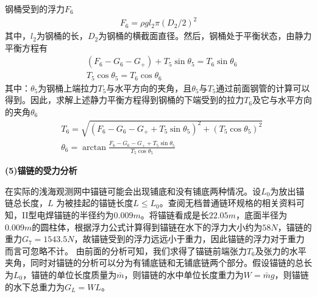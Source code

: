             \par
            钢桶受到的浮力$F_6$
            \begin{align*}
            F_6 = \rho g l_2 \pi ( {D_2}/{2} ) ^2
            \end{align*}
            其中，$l_2$为钢桶的长，$D_2$为钢桶的横截面直径。然后，钢桶处于平衡状态，由静力平衡方程有
            \begin{align*}
            & (F_6 - G_6 - G_+) +T_5\sin \theta_5 = T_6\sin  \theta_6\\
            & T_5\cos\theta_5 = T_6\cos \theta_6
            \end{align*}
            其中：$\theta_5$为钢桶上端拉力$T_5$与水平方向的夹角，且$\theta_5$与$T_5$通过前面钢管的计算可以得到。因此，求解上述静力平衡方程得到钢桶的下端受到的拉力$T_6$及它与水平方向的夹角$\theta_6$
            \begin{align*}
            & T_6 = \sqrt{(F_6 - G_6 -G_+ +T_5\sin \theta_5)^2+(T_5\cos\theta_5)^2}\\
            & \theta_6 = \arctan \frac{F_6-G_6 - G_++T_5\sin \theta_5}{T_5\cos \theta_5}
            \end{align*}
            \par
            \textbf{(5)锚链的受力分析}
            \par
            在实际的浅海观测网中锚链可能会出现铺底和没有铺底两种情况。设$L_0$为放出锚链总长度，$L$ 为被挂起的锚链长度$L \leqslant L_0$。查阅无档普通链环规格的相关资料可知，II型电焊锚链的半径约为$0.009m$。将锚链看成是长$22.05m$，底面半径为$0.009m$的圆柱体，根据浮力公式计算得到锚链在水下的浮力大小约为$58N$，锚链的重力$G_7 = 1543.5N$，故锚链受到的浮力远远小于重力，因此锚链的浮力对于重力而言可忽略不计。
            由前面的分析可知，我们求得了锚链前端张力$T_6$及张力的水平夹角，同时对锚链的分析可以分为有铺底链和无铺底链两个部分。假设锚链的总长为$L_0$，锚链的单位长度质量为$\bar{m}$，则锚链的水中单位长度重力为$W = \bar{m}g$，则锚链的水下总重力为$G_L = WL$。
